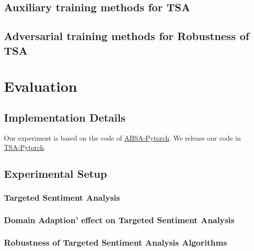 \documentclass[fyp]{socreport}
\begin{document}
\section{Auxiliary training methods for TSA}


\section{Adversarial training methods for Robustness of TSA}





\chapter{Evaluation}


\section{Implementation Details}
Our experiment is based on the code of \href{https://github.com/songyouwei/ABSA-PyTorch}{ABSA-Pytorch}. 
We release our code in \href{https://github.com/Xiang-Pan/ABSA-PyTorch}{TSA-Pytorch}.
\section{Experimental Setup}

\subsection{Targeted Sentiment Analysis}

\subsection{Domain Adaption' effect on Targeted Sentiment Analysis}


\subsection{Robustness of Targeted Sentiment Analysis Algorithms}
\end{document}
